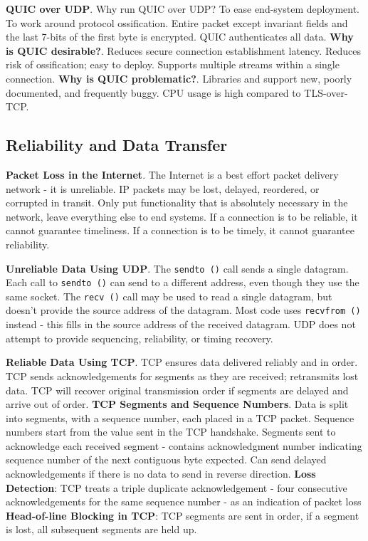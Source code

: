 \documentclass{article}
\begin{document}
\vspace{\baselineskip}
\textbf{QUIC over UDP}. Why run QUIC over UDP\@? To ease end-system deployment.
To work around protocol ossification.
Entire packet except invariant fields and the last 7-bits of the first byte is encrypted.
QUIC authenticates all data.
\textbf{Why is QUIC desirable?}.
Reduces secure connection establishment latency.
Reduces risk of ossification; easy to deploy.
Supports multiple streams within a single connection.
\textbf{Why is QUIC problematic?}.
Libraries and support new, poorly documented, and frequently buggy.
CPU usage is high compared to TLS-over-TCP\@.

\clearpage

\subsection*{Reliability and Data Transfer}

\textbf{Packet Loss in the Internet}.
The Internet is a best effort packet delivery network {-} it is unreliable.
IP packets may be lost, delayed, reordered, or corrupted in transit.
Only put functionality that is absolutely necessary in the network, leave everything else to end systems.
If a connection is to be reliable, it cannot guarantee timeliness.
If a connection is to be timely, it cannot guarantee reliability.

\vspace{\baselineskip}
\textbf{Unreliable Data Using UDP}.
The \texttt{sendto ()} call sends a single datagram.
Each call to \texttt{sendto ()} can send to a different address, even though they use the same socket.
The \texttt{recv ()} call may be used to read a single datagram, but doesn't provide the source address of the datagram.
Most code uses \texttt{recvfrom ()} instead {-} this fills in the source address of the received datagram.
UDP does not attempt to provide sequencing, reliability, or timing recovery.

\vspace{\baselineskip}
\textbf{Reliable Data Using TCP}.
TCP ensures data delivered reliably and in order.
TCP sends acknowledgements for segments as they are received; retransmits lost data.
TCP will recover original transmission order if segments are delayed and arrive out of order.
\textbf{TCP Segments and Sequence Numbers}. Data is split into segments, with a sequence number, each placed in a TCP packet.
Sequence numbers start from the value sent in the TCP handshake.
Segments sent to acknowledge each received segment {-} contains acknowledgment number indicating sequence number of the next
contiguous byte expected.
Can send delayed acknowledgements if there is no data to send in reverse direction.
\textbf{Loss Detection}: TCP treats a triple duplicate acknowledgement {-} four consecutive acknowledgements for the same sequence
number {-} as an indication of packet loss
\textbf{Head-of-line Blocking in TCP}: TCP segments are sent in order, if a segment is lost, all subsequent segments are held up.
\end{document}

